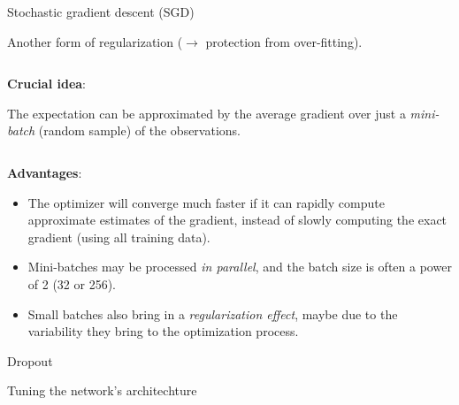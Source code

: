 \documentclass[
  10pt,
  ignorenonframetext,
]{beamer}
\begin{document}
\begin{frame}
\begin{block}{Stochastic gradient descent (SGD)}
\protect\hypertarget{stochastic-gradient-descent-sgd}{}
\(~\)

Another form of regularization (\(\rightarrow\) protection from
over-fitting).

\(~\)

\textbf{Crucial idea}:

The expectation can be approximated by the average gradient over just a
\emph{mini-batch} (random sample) of the observations.

\(~\)

\textbf{Advantages}:

\vspace{1mm}

\begin{itemize}
\item
  The optimizer will converge much faster if it can rapidly compute
  approximate estimates of the gradient, instead of slowly computing the
  exact gradient (using all training data).
\item
  Mini-batches may be processed \emph{in parallel}, and the batch size
  is often a power of 2 (32 or 256).
\item
  Small batches also bring in a \emph{regularization effect}, maybe due
  to the variability they bring to the optimization process.
\end{itemize}
\end{block}
\end{frame}

\begin{frame}
\begin{block}{Dropout}
\protect\hypertarget{dropout}{}
\end{block}
\end{frame}

\begin{frame}
\begin{block}{Tuning the network's architechture}
\protect\hypertarget{tuning-the-networks-architechture}{}
\end{block}
\end{frame}
\end{document}
